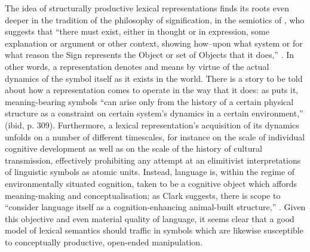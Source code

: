 The idea of structurally productive lexical representations finds its roots even deeper in the tradition of the philosophy of signification, in the semiotics of \citeauthor{Peirce1932}, who suggests that ``there must exist, either in thought or in expression, some explanation or argument or other context, showing how--upon what system or for what reason the Sign represents the Object or set of Objects that it does,'' \cite[][\P 2.230]{Peirce1932}.  In other words, a representation denotes and means by virtue of the actual dynamics of the symbol itself as it exists in the world.  There is a story to be told about how a representation comes to operate in the way that it does: as \citeauthor{RaczaszekLeonardi2012} puts it, meaning-bearing symbols ``can arise only from the history of a certain physical structure as a constraint on certain system's dynamics in a certain environment,'' (ibid, p. 309).  Furthermore, a lexical representation's acquisition of its dynamics unfolds on a number of different timescales, for instance on the scale of individual cognitive development as well as on the scale of the history of cultural transmission, effectively prohibiting any attempt at an elimitivist interpretations of linguistic symbols as atomic units.  Instead, language is, within the regime of environmentally situated cognition, taken to be a cognitive object which affords meaning-making and conceptualisation; as Clark suggests, there is scope to ``consider language itself as a cognition-enhancing animal-built structure,'' \citep[][p. 370]{Clark2006}.  Given this objective and even material quality of language, it seems clear that a good model of lexical semantics should traffic in symbols which are likewise susceptible to conceptually productive, open-ended manipulation.


